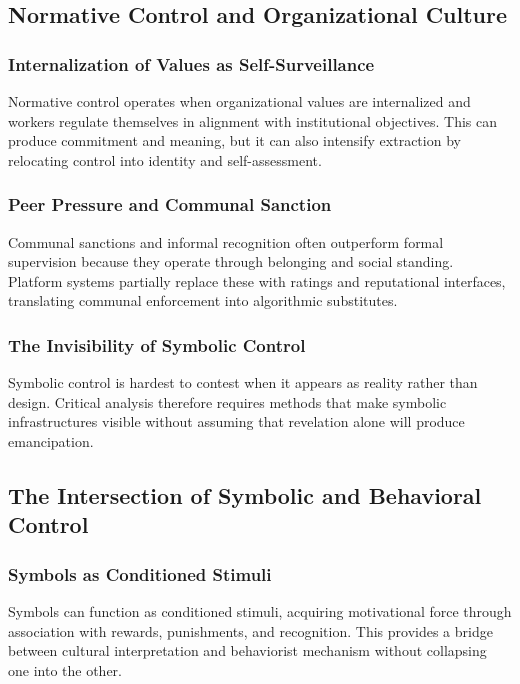 \documentclass[11pt, a4paper]{article}
\begin{document}
\subsection{Normative Control and Organizational Culture}

\subsubsection{Internalization of Values as Self-Surveillance}
Normative control operates when organizational values are internalized and workers regulate themselves in alignment with institutional objectives. This can produce commitment and meaning, but it can also intensify extraction by relocating control into identity and self-assessment.

\subsubsection{Peer Pressure and Communal Sanction}
Communal sanctions and informal recognition often outperform formal supervision because they operate through belonging and social standing. Platform systems partially replace these with ratings and reputational interfaces, translating communal enforcement into algorithmic substitutes.

\subsubsection{The Invisibility of Symbolic Control}
Symbolic control is hardest to contest when it appears as reality rather than design. Critical analysis therefore requires methods that make symbolic infrastructures visible without assuming that revelation alone will produce emancipation.

\subsection{The Intersection of Symbolic and Behavioral Control}

\subsubsection{Symbols as Conditioned Stimuli}
Symbols can function as conditioned stimuli, acquiring motivational force through association with rewards, punishments, and recognition. This provides a bridge between cultural interpretation and behaviorist mechanism without collapsing one into the other.
\end{document}
